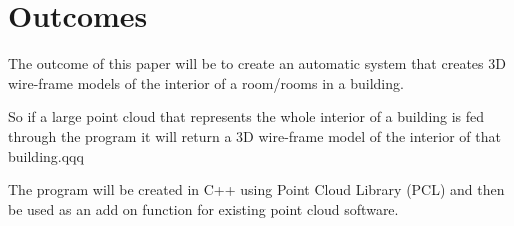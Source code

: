 

\section{Outcomes}

The outcome of this paper will be to create an automatic system that creates 3D wire-frame models of the interior of a room/rooms in a building. 

So if a large point cloud that represents the whole interior of a building is fed through the program it will return a 3D wire-frame model of the interior of that building.qqq

The program will be created in C++ using Point Cloud Library (PCL) and then be used as an add on function for existing point cloud software.
